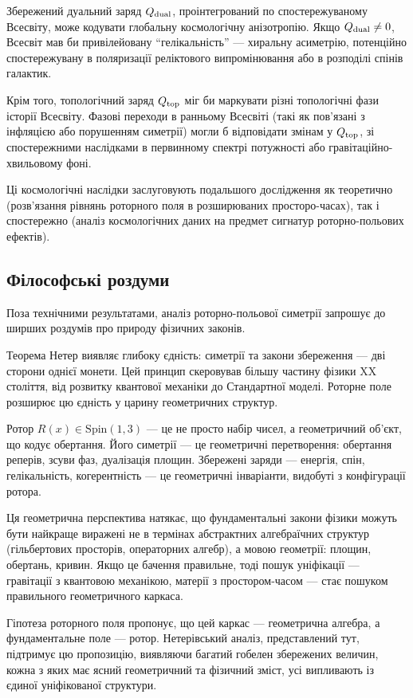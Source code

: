 \documentclass[11pt,a4paper]{article}
\numberwithin{equation}{section}
\theoremstyle{plain}
\theoremstyle{definition}
\theoremstyle{remark}
\begin{document}
Збережений дуальний заряд $Q_{\rm dual}$, проінтегрований по спостережуваному Всесвіту, може кодувати глобальну космологічну анізотропію. Якщо $Q_{\rm dual} \neq 0$, Всесвіт мав би привілейовану ``гелікальність'' — хиральну асиметрію, потенційно спостережувану в поляризації реліктового випромінювання або в розподілі спінів галактик.

Крім того, топологічний заряд $Q_{\rm top}$ міг би маркувати різні топологічні фази історії Всесвіту. Фазові переходи в ранньому Всесвіті (такі як пов'язані з інфляцією або порушенням симетрії) могли б відповідати змінам у $Q_{\rm top}$, зі спостережними наслідками в первинному спектрі потужності або гравітаційно-хвильовому фоні.

Ці космологічні наслідки заслуговують подальшого дослідження як теоретично (розв'язання рівнянь роторного поля в розширюваних просторо-часах), так і спостережно (аналіз космологічних даних на предмет сигнатур роторно-польових ефектів).

\subsection{Філософські роздуми}

Поза технічними результатами, аналіз роторно-польової симетрії запрошує до ширших роздумів про природу фізичних законів.

Теорема Нетер виявляє глибоку єдність: симетрії та закони збереження — дві сторони однієї монети. Цей принцип скеровував більшу частину фізики XX століття, від розвитку квантової механіки до Стандартної моделі. Роторне поле розширює цю єдність у царину геометричних структур.

Ротор $R(x) \in \mathrm{Spin}(1,3)$ — це не просто набір чисел, а геометричний об'єкт, що кодує обертання. Його симетрії — це геометричні перетворення: обертання реперів, зсуви фаз, дуалізація площин. Збережені заряди — енергія, спін, гелікальність, когерентність — це геометричні інваріанти, видобуті з конфігурації ротора.

Ця геометрична перспектива натякає, що фундаментальні закони фізики можуть бути найкраще виражені не в термінах абстрактних алгебраїчних структур (гільбертових просторів, операторних алгебр), а мовою геометрії: площин, обертань, кривин. Якщо це бачення правильне, тоді пошук уніфікації — гравітації з квантовою механікою, матерії з простором-часом — стає пошуком правильного геометричного каркаса.

Гіпотеза роторного поля пропонує, що цей каркас — геометрична алгебра, а фундаментальне поле — ротор. Нетерівський аналіз, представлений тут, підтримує цю пропозицію, виявляючи багатий гобелен збережених величин, кожна з яких має ясний геометричний та фізичний зміст, усі випливають із єдиної уніфікованої структури.
\end{document}
